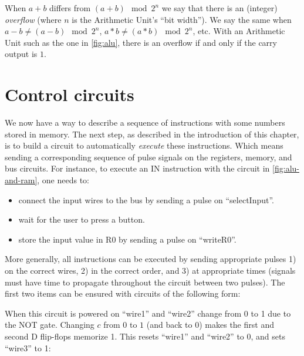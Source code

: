 When $a+b$ differs from $(a+b) \mod 2^n$ we say that there is an (integer) {\em
overflow} (where $n$ is the Arithmetic Unit's ``bit width''). We say the same
when $a-b \ne (a-b) \mod 2^n$, $a*b \ne (a*b) \mod 2^n$, etc. With an
Arithmetic Unit such as the one in \cref{fig:alu}, there is an overflow if and
only if the carry output is $1$.

\section{Control circuits}

We now have a way to describe a sequence of instructions with some numbers
stored in memory. The next step, as described in the introduction of this
chapter, is to build a circuit to automatically {\em execute} these
instructions. Which means sending a corresponding sequence of pulse signals on
the registers, memory, and bus circuits. For instance, to execute an IN
instruction with the circuit in
\cref{fig:alu-and-ram}, one needs to:
\begin{itemize}
  \item connect the input wires to the bus by sending a pulse on
  ``selectInput''.

  \item wait for the user to press a button.

  \item store the input value in R0 by sending a pulse on ``writeR0''.
\end{itemize}

More generally, all instructions can be executed by sending appropriate pulses
1) on the correct wires, 2) in the correct order, and 3) at appropriate times
(signals must have time to propagate throughout the circuit between two
pulses). The first two items can be ensured with circuits of the following
form:

\begin{center}
  
\end{center}

When this circuit is powered on ``wire1'' and ``wire2'' change from 0 to 1 due
to the NOT gate. Changing $c$ from $0$ to $1$ (and back to $0$) makes the first
and second D flip-flops memorize 1. This resets ``wire1'' and ``wire2'' to 0,
and sets ``wire3'' to 1:

\begin{center}
  
\end{center}

